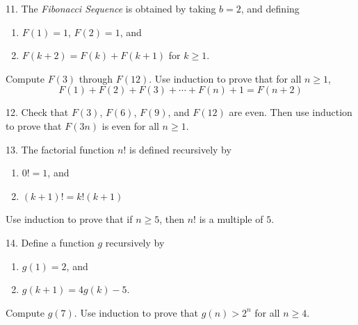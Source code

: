 \documentclass{article}
\newcommand{\0}{\mathbf 0}
\newcommand{\1}{\mathbf 1}
\begin{document}
\begin{description}
  \item{11.} The \emph{Fibonacci Sequence} is obtained by taking $b = 2$, and defining
    \begin{enumerate}[\hspace{1cm}(1.)]
      \item $F(1) = 1$, $F(2) = 1$, and
      \item $F(k+2) = F(k) + F(k+1)$ for $k \geq 1$.
    \end{enumerate}
    Compute $F(3)$ through $F(12)$. Use induction to prove that for all $n \geq 1$,
    \begin{equation*}
    F(1) + F(2) + F(3) + \cdots + F(n) + 1 = F(n+2)
    \end{equation*}

  \item{12.} Check that $F(3)$, $F(6)$, $F(9)$, and $F(12)$ are even. Then use induction to prove that $F(3n)$ is even for all $n \geq 1$.

  \item{13.} The factorial function $n!$ is defined recursively by
    \begin{enumerate}[\hspace{1cm}(1.)]
      \item $0! = 1$, and
      \item $(k+1)! = k!(k+1)$
    \end{enumerate}
    Use induction to prove that if $n \geq 5$, then $n!$ is a multiple of $5$.

  \item{14.} Define a function $g$ recursively by
    \begin{enumerate}[\hspace{1cm}(1.)]
      \item $g(1) = 2$, and
      \item $g(k+1) = 4g(k) - 5$.
    \end{enumerate}
    Compute $g(7)$. Use induction to prove that $g(n) > 2^n$ for all $n \geq 4$.
\end{description}

\subsection*{ }
\end{document}
